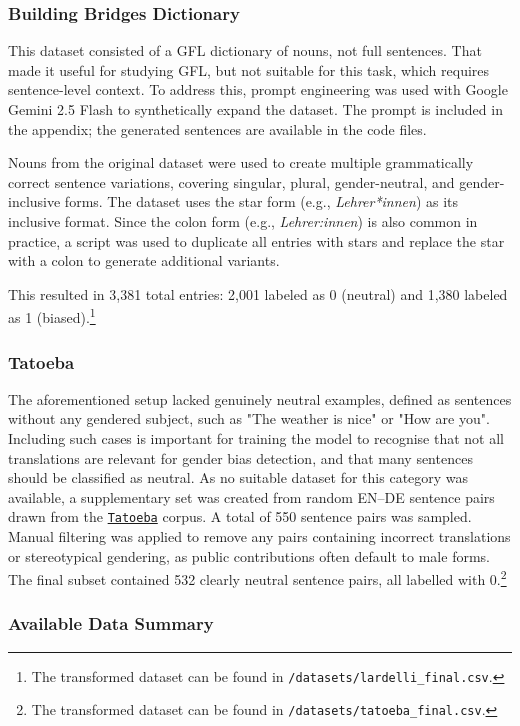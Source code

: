 \subsubsection{Building Bridges Dictionary} 
This dataset consisted of a GFL dictionary of nouns, not full sentences. That made it useful for studying GFL, but not suitable for this task, which requires sentence-level context. To address this, prompt engineering was used with Google Gemini 2.5 Flash to synthetically expand the dataset. The prompt is included in the appendix; the generated sentences are available in the code files.

Nouns from the original dataset were used to create multiple grammatically correct sentence variations, covering singular, plural, gender-neutral, and gender-inclusive forms. The dataset uses the star form (e.g., \textit{Lehrer*innen}) as its inclusive format. Since the colon form (e.g., \textit{Lehrer:innen}) is also common in practice, a script was used to duplicate all entries with stars and replace the star with a colon to generate additional variants.

This resulted in 3,381 total entries: 2,001 labeled as 0 (neutral) and 1,380 labeled as 1 (biased).\footnote{The transformed dataset can be found in \texttt{/datasets/lardelli\_final.csv}.}

\subsubsection{Tatoeba} 

The aforementioned setup lacked genuinely neutral examples, defined as sentences without any gendered subject, such as "The weather is nice" or "How are you". Including such cases is important for training the model to recognise that not all translations are relevant for gender bias detection, and that many sentences should be classified as neutral. As no suitable dataset for this category was available, a supplementary set was created from random EN–DE sentence pairs drawn from the \texttt{\href{https://tatoeba.org/en/}{Tatoeba}} corpus. A total of 550 sentence pairs was sampled. Manual filtering was applied to remove any pairs containing incorrect translations or stereotypical gendering, as public contributions often default to male forms. The final subset contained 532 clearly neutral sentence pairs, all labelled with 0.\footnote{The transformed dataset can be found in \texttt{/datasets/tatoeba\_final.csv}.}


\subsubsection{Available Data Summary}

